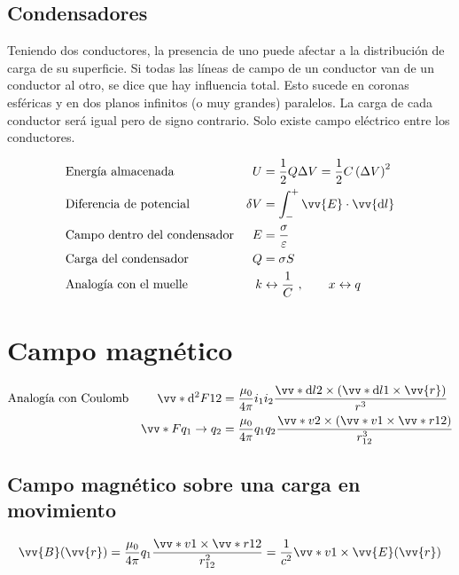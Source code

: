 \documentclass[a4paper, 8pt]{extarticle}
\renewcommand{\vec}[1]{\vv{{#1}}}
\begin{document}
\begin{multicols}{3}
  \subsection{Condensadores}
  Teniendo dos conductores, la presencia de uno puede afectar a la distribución de carga de su superficie. Si todas las líneas de campo de un conductor van de un conductor al otro, se dice que hay influencia total. Esto sucede en coronas esféricas y en dos planos infinitos (o muy grandes) paralelos. La carga de cada conductor será igual pero de signo contrario. Solo existe campo eléctrico entre los conductores.

  \begin{align*}
     & \text{Energía almacenada}           & U        & = \frac{1}{2}Q\Delta V= \frac{1}{2} C \left( \Delta V \right)^2 \\
     & \text{Diferencia de potencial}      & \delta V & = \int_{-}^{+}\vec{E}\cdot \vec{\dd l}                          \\
     & \text{Campo dentro del condensador} & E        & = \frac{\sigma}{\varepsilon}                                    \\
     & \text{Carga del condensador}        & Q        & = \sigma S                                                      \\
     & \text{Analogía con el muelle}       & k        & \leftrightarrow \frac{1}{C} \ , \qquad x \leftrightarrow q
  \end{align*}

  \newpage
  \section{Campo magnético}

  \begin{align*}
     & \text{Analogía con Coulomb} & \vv*{\dd ^2 F}{12}  & =\frac{\mu_0}{4\pi}i_1i_2\frac{\vv*{\dd l}{2}\times \left( \vv*{\dd l}{1}\times \vec{r} \right)}{r^3}  \\
     &                             & \vv*{F}{q_1\to q_2} & =\frac{\mu_0}{4\pi}q_1q_2\frac{\vv*{v}{2}\times \left( \vv*{v}{1}\times \vv*{r}{12} \right)}{r_{12}^3}
  \end{align*}
  \subsection{Campo magnético sobre una carga en movimiento}
  \[ \vec{B}(\vec{r}) = \frac{\mu_0}{4\pi}q_1\frac{\vv*{v}{1}\times \vv*{r}{12}}{r_{12}^2}= \frac{1}{c^2}\vv*{v}{1}\times \vec{E}(\vec{r}) \]


\end{multicols}
\end{document}
